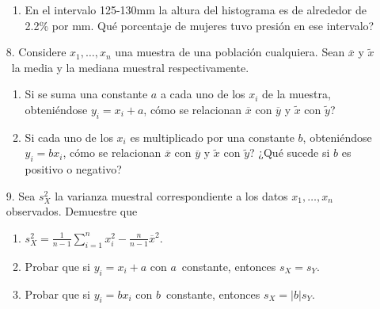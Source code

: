 \documentclass[a4paper, 11pt]{article}
\begin{document}
\begin{enumerate}
\begin{enumerate}
\item En el intervalo 125-130mm la altura del histograma es de alrededor de
2.2\% por mm. \textquestiondown Qué porcentaje de mujeres tuvo presión
en ese intervalo?
\end{enumerate}


\item[8.] Considere $x_{1},\ldots,x_{n}$ una muestra de una población
cualquiera. Sean $\overline{x}$ y $\widetilde{x}$\ la media y la mediana
muestral respectivamente.


\begin{enumerate}
\item Si se suma una constante $a$ a cada uno de los $x_{i}$ de la muestra,
obteniéndose $y_{i}=x_{i}+a$, \textquestiondown cómo se relacionan
$\overline{x}$ con $\overline{y}$ y $\widetilde{x}$ con $\widetilde{y}$?


\item Si cada uno de los $x_{i}$ es multiplicado por una constante $b$,
obteniéndose $y_{i}=bx_{i}$, \textquestiondown cómo se relacionan
$\overline{x}$ con $\overline{y}$ y $\widetilde{x}$ con $\widetilde{y}$? ¿Qué sucede si $b$ es positivo o negativo?
\end{enumerate}


\item[9.] Sea $s_{X}^{2}$ la varianza muestral correspondiente a los datos
$x_{1},\ldots,x_{n}$ observados. Demuestre que


\begin{enumerate}
\item $s_{X}^{2}=\frac{1}{n-1}\sum_{i=1}^{n}x_{i}^{2}-\frac{n}{n-1}%
\overline{x}^{2}$.


\item Probar que si $y_{i}=x_{i}+a$ con $a$\ constante, entonces $s_{X}=s_{Y}$.


\item Probar que si $y_{i}=bx_{i}$ con $b$\ constante, entonces $s_{X}%
=\left\vert b\right\vert s_{Y}$.
\end{enumerate}
\end{enumerate}
\end{document}

